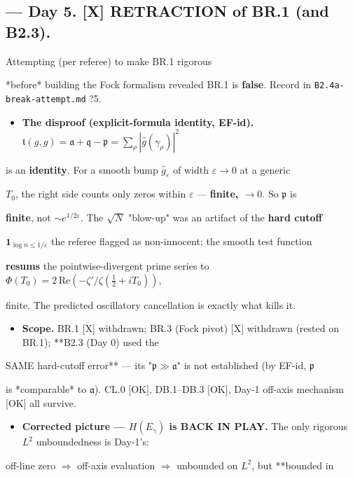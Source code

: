 \documentclass[10pt]{article}
\begin{document}
\subsection*{ --- Day 5. [X] RETRACTION of BR.1 (and B2.3).}
Attempting (per referee) to make BR.1 rigorous\par
*before* building the Fock formalism revealed BR.1 is \textbf{false}. Record in \texttt{B2.4a-break-attempt.md} ?5.\par
\begin{itemize}
\item \textbf{The disproof (explicit-formula identity, EF-id).} $\mathfrak t(g,g)=\mathfrak a+\mathfrak q-\mathfrak p=\sum_\rho|\widehat g(\gamma_\rho)|^2$
\end{itemize}
  is an \textbf{identity}. For a smooth bump $\widehat g_\varepsilon$ of width $\varepsilon\to0$ at a generic\par
  $T_0$, the right side counts only zeros within $\varepsilon$ --- \textbf{finite, $\to0$}. So $\mathfrak p$ is\par
  \textbf{finite}, not $\sim e^{1/2\varepsilon}$. The $\sqrt N$ "blow-up" was an artifact of the \textbf{hard cutoff}\par
  $\mathbf 1_{\log n\le1/\varepsilon}$ the referee flagged as non-innocent; the smooth test function\par
  \textbf{resums} the pointwise-divergent prime series to $\Phi(T_0)=2\,\mathrm{Re}(-\zeta'/\zeta(\tfrac12+iT_0))$,\par
  finite. The predicted oscillatory cancellation is exactly what kills it.\par
\begin{itemize}
\item \textbf{Scope.} BR.1 [X] withdrawn; BR.3 (Fock pivot) [X] withdrawn (rested on BR.1); **B2.3 (Day 0) used the
\end{itemize}
  SAME hard-cutoff error** --- its "$\mathfrak p\gg\mathfrak a$" is not established (by EF-id, $\mathfrak p$\par
  is *comparable* to $\mathfrak a$). CL.0 [OK], DB.1--DB.3 [OK], Day-1 off-axis mechanism [OK] all survive.\par
\begin{itemize}
\item \textbf{Corrected picture --- $H(E_\gamma)$ is BACK IN PLAY.} The only rigorous $L^2$ unboundedness is Day-1's:
\end{itemize}
  off-line zero $\Rightarrow$ off-axis evaluation $\Rightarrow$ unbounded on $L^2$, but **bounded in\par
\end{document}
